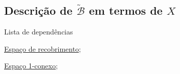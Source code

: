 \subsection{Descrição de $\tilde{\mathcal{B}}$ em termos de $X$} %
\label{descrição-da-base-do-recobrimento-prop}
\begin{titlemize}{Lista de dependências}
	\item \hyperref[espaco-de-recobrimento-def]{Espaço de recobrimento};\\ %
	\item \hyperref[espaço-1-conexo-def]{Espaço 1-conexo};\\
\end{titlemize}





